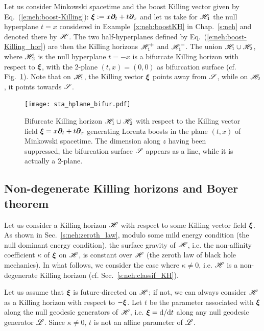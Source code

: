 \begin{example}
\label{x:sta:bif-KH-boost}
Let us consider Minkowski spacetime and the boost Killing vector given
by Eq.~(\ref{e:neh:boost-Killing}): $\bm{\xi} := x \bm{\partial}_t + t \bm{\partial}_x$
and let us take for $\mathscr{H}_1$ the null hyperplane $t=x$
considered in Example~\ref{x:neh:boostKH} in Chap.~\ref{s:neh} and denoted there
by $\mathscr{H}$. The two half-hyperplanes defined by
Eq.~(\ref{e:neh:boost-Killing_hor}) are then the Killing horizons $\mathscr{H}_1^+$ and
$\mathscr{H}_1^-$. The union $\mathscr{H}_1 \cup \mathscr{H}_2$, where $\mathscr{H}_2$ is the null hyperplane $t=-x$ is a bifurcate Killing horizon with respect to $\bm{\xi}$,
with the 2-plane $(t,x)=(0,0)$ as bifurcation surface
(cf. Fig.~\ref{f:sta:hplane_bifur}). Note that on $\mathscr{H}_1$, the Killing vector
$\bm{\xi}$ points away from $\mathscr{S}$, while on $\mathscr{H}_2$, it points towards $\mathscr{S}$.
\end{example}

\begin{figure}
\centerline{\texttt{[image: sta\_hplane\_bifur.pdf]}}
\caption[]{\label{f:sta:hplane_bifur} \footnotesize
Bifurcate Killing horizon $\mathscr{H}_1\cup\mathscr{H}_2$ with respect to the Killing vector
field $\bm{\xi} = x \bm{\partial}_t + t \bm{\partial}_x$ generating Lorentz boosts in the plane $(t,x)$ of Minkowski spacetime. The dimension along $z$ having been suppressed, the bifurcation
surface $\mathscr{S}$ appears as a line, while it is actually a 2-plane.}
\end{figure}



\subsection{Non-degenerate Killing horizons and Boyer theorem}
\label{s:sta:non-degenerate_KH}

Let us consider a Killing horizon $\mathscr{H}$ with respect to some Killing vector
field $\bm{\xi}$. As shown in Sec.~\ref{s:neh:zeroth_law},
modulo some mild energy condition (the null dominant energy condition),
the surface gravity of $\mathscr{H}$, i.e.
the non-affinity coefficient $\kappa$ of $\bm{\xi}$ on $\mathscr{H}$,
is constant over
$\mathscr{H}$ (the zeroth law of black hole mechanics).
In what follows, we consider the case where $\kappa\not=0$, i.e. $\mathscr{H}$
is a non-degenerate Killing horizon (cf. Sec.~\ref{s:neh:classif_KH}).

Let us assume that $\bm{\xi}$ is future-directed on $\mathscr{H}$; if not, we can
always consider $\mathscr{H}$ as a Killing horizon with respect to $-\bm{\xi}$.
Let $t$ be the parameter
associated with $\bm{\xi}$ along the null geodesic generators of $\mathscr{H}$, i.e.
$\bm{\xi} = \mathrm{d}/\mathrm{d} t$ along any null geodesic generator $\mathscr{L}$.
Since $\kappa\not=0$, $t$ is not an affine parameter of $\mathscr{L}$.

